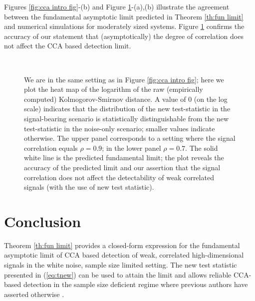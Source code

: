 \documentclass[conference]{IEEEtran}
\begin{document}
Figures \ref{fig:cca intro fig}-(b) and Figure \ref{fig:fig2}-(a),(b) illustrate the agreement between the fundamental asymptotic limit predicted in Theorem \ref{th:fun limit} and numerical simulations for moderately sized systems. Figure \ref{fig:fig2} confirms the accuracy of our statement that (asymptotically) the degree of correlation does not affect the CCA based detection limit.

\begin{figure}[!t]
\\[-0.35cm]
\caption{We are in the same setting as in Figure \ref{fig:cca intro fig}; here we plot the heat map of the logarithm of the raw (empirically computed) Kolmogorov-Smirnov distance. A value of $0$ (on the log scale) indicates that the distribution of the new test-statistic in the signal-bearing scenario is statistically distinguishable from the new test-statistic in the noise-only scenario; smaller values indicate otherwise. The upper panel corresponds to a setting where the signal correlation equals $\rho = 0.9$; in the lower panel $\rho = 0.7$. The solid white line is the predicted fundamental limit; the plot reveals the accuracy of the predicted limit and our assertion that the signal correlation does not affect the detectability of weak correlated signals (with the use of new test statistic).}
\label{fig:fig2}
\vspace{-0.7cm}
\end{figure}



\section{Conclusion}\label{sec:conclusion}

Theorem \ref{th:fun limit} provides a closed-form expression for the  fundamental asymptotic limit of CCA based detection of weak, correlated high-dimensional signals in the white noise, sample size limited setting. The new test statistic presented in (\ref{eq:tnew}) can be used to attain the limit and allows reliable CCA-based detection in the sample size deficient regime where previous authors have asserted otherwise \cite{pezeshki2005empirical,ge2009does}.




\end{document}

